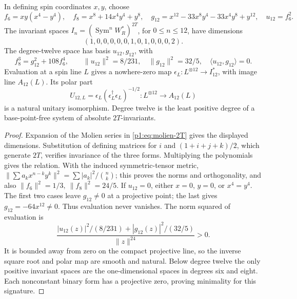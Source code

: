 \documentclass[11pt]{article}
\begin{document}
\begin{proposition}
\label{p1:prop:higher-invariant-pencil}
In defining spin coordinates \(x,y\), choose
\[
 f_6=xy(x^4-y^4),\quad f_8=x^8+14x^4y^4+y^8,\quad
 g_{12}=x^{12}-33x^8y^4-33x^4y^8+y^{12},\quad u_{12}=f_6^2.
\]
The invariant spaces \(I_n=(\operatorname{Sym}^nW_R^*)^{2T}\), for
\(0\leq n\leq12\), have dimensions
\[
 (1,0,0,0,0,0,1,0,1,0,0,0,2).
\]
The degree-twelve space has basis \(u_{12},g_{12}\), with
\[
 f_8^3=g_{12}^2+108f_6^4,\qquad
 \|u_{12}\|^2=8/231,\quad \|g_{12}\|^2=32/5,\quad
 \langle u_{12},g_{12}\rangle=0.
\]
Evaluation at a spin line \(L\) gives a nowhere-zero map
\(\epsilon_L:L^{\otimes12}\to I_{12}^*\), with image line \(A_{12}(L)\).
Its polar part
\[
 U_{12,L}=\epsilon_L(\epsilon_L^\dagger\epsilon_L)^{-1/2}:
 L^{\otimes12}\longrightarrow A_{12}(L)
\]
is a natural unitary isomorphism.  Degree twelve is the least positive
degree of a base-point-free system of absolute \(2T\)-invariants.
\end{proposition}
\begin{proof}
Expansion of the Molien series in \eqref{p1:eq:molien-2T} gives the
displayed dimensions.  Substitution of defining matrices for \(i\) and
\((1+i+j+k)/2\), which generate \(2T\), verifies invariance of the three
forms.  Multiplying the polynomials gives the relation.  With the induced
symmetric-tensor metric,
\(\|\sum a_kx^{n-k}y^k\|^2=\sum|a_k|^2/\binom nk\); this proves the
norms and orthogonality, and also
\(\|f_6\|^2=1/3,\ \|f_8\|^2=24/5\).
If \(u_{12}=0\), either \(x=0\), \(y=0\), or \(x^4=y^4\).
The first two cases leave \(g_{12}\ne0\) at a projective point; the last
gives \(g_{12}=-64x^{12}\ne0\).  Thus evaluation never vanishes.
The norm squared of evaluation is
\[
 \frac{|u_{12}(z)|^2/(8/231)+|g_{12}(z)|^2/(32/5)}{\|z\|^{24}}>0.
\]
It is bounded away from zero on the compact projective line, so the
inverse square root and polar map are smooth and natural.  Below degree
twelve the only positive invariant spaces are the one-dimensional spaces
in degrees six and eight.  Each nonconstant binary form has a projective
zero, proving minimality for this signature.
\end{proof}
\end{document}
